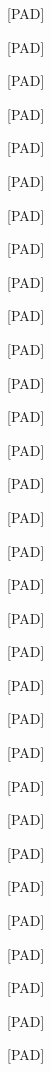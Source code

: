 \documentclass[varwidth=150mm]{standalone}
\begin{document}
\begin{CJK*}{UTF8}{gbsn}
{{{\colorbox{red!0.0}{\strut [PAD]} \colorbox{red!0.0}{\strut [PAD]} \colorbox{red!0.0}{\strut [PAD]} \colorbox{red!0.0}{\strut [PAD]} \colorbox{red!0.0}{\strut [PAD]} \colorbox{red!0.0}{\strut [PAD]} \colorbox{red!0.0}{\strut [PAD]} \colorbox{red!0.0}{\strut [PAD]} \colorbox{red!0.0}{\strut [PAD]} \colorbox{red!0.0}{\strut [PAD]} \colorbox{red!0.0}{\strut [PAD]} \colorbox{red!0.0}{\strut [PAD]} \colorbox{red!0.0}{\strut [PAD]} \colorbox{red!0.0}{\strut [PAD]} \colorbox{red!0.0}{\strut [PAD]} \colorbox{red!0.0}{\strut [PAD]} \colorbox{red!0.0}{\strut [PAD]} \colorbox{red!0.0}{\strut [PAD]} \colorbox{red!0.0}{\strut [PAD]} \colorbox{red!0.0}{\strut [PAD]} \colorbox{red!0.0}{\strut [PAD]} \colorbox{red!0.0}{\strut [PAD]} \colorbox{red!0.0}{\strut [PAD]} \colorbox{red!0.0}{\strut [PAD]} \colorbox{red!0.0}{\strut [PAD]} \colorbox{red!0.0}{\strut [PAD]} \colorbox{red!0.0}{\strut [PAD]} \colorbox{red!0.0}{\strut [PAD]} \colorbox{red!0.0}{\strut [PAD]} \colorbox{red!0.0}{\strut [PAD]} \colorbox{red!0.0}{\strut [PAD]} \colorbox{red!0.0}{\strut [PAD]}
}}}
\end{CJK*}
\end{document}
